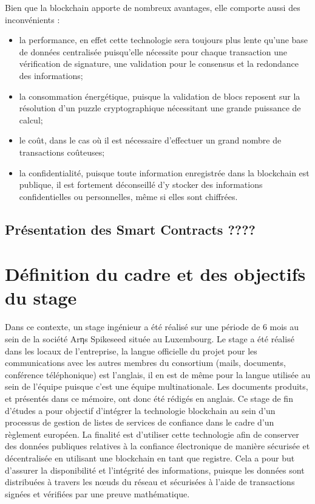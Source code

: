 \documentclass{tnreport}
\begin{document}
Bien que la blockchain apporte de nombreux avantages, elle comporte aussi des inconvénients :
\begin{itemize}
	\item la performance, en effet cette technologie sera toujours plus lente qu'une base de données centralisée puisqu'elle nécessite pour chaque transaction une vérification de signature, une validation pour le consensus et la redondance des informations; 
	\item la consommation énergétique, puisque la validation de blocs reposent sur la résolution d'un puzzle cryptographique nécessitant une grande puissance de calcul; 
	\item le coût, dans le cas où il est nécessaire d'effectuer un grand nombre de transactions coûteuses;
	\item la confidentialité, puisque toute information enregistrée dans la blockchain est publique, il est fortement déconseillé d'y stocker des informations confidentielles ou personnelles, même si elles sont chiffrées.
\end{itemize}

\subsection{Présentation des Smart Contracts ????}

\section{Définition du cadre et des objectifs du stage}

Dans ce contexte, un stage ingénieur a été réalisé sur une période de 6 mois au sein de la société Arηs Spikeseed située au Luxembourg. 
Le stage a été réalisé dans les locaux de l'entreprise, la langue officielle du projet pour les communications avec les autres membres du consortium (mails, documents, conférence téléphonique) est l’anglais, il en est de même pour la langue utilisée au sein de l'équipe puisque c'est une équipe multinationale. Les documents produits, et présentés dans ce mémoire, ont donc été rédigés en anglais.
Ce stage de fin d'études a pour objectif d'intégrer la technologie blockchain au sein d'un processus de gestion de listes de services de confiance dans le cadre d'un règlement européen. 
La finalité est d'utiliser cette technologie afin de conserver des données publiques relatives à la confiance électronique de manière sécurisée et décentralisée en utilisant une blockchain en tant que registre.
Cela a pour but d'assurer la disponibilité et l'intégrité des informations, puisque les données sont distribuées à travers les nœuds du réseau et sécurisées à l'aide de transactions signées et vérifiées par une preuve mathématique. 
\end{document}
